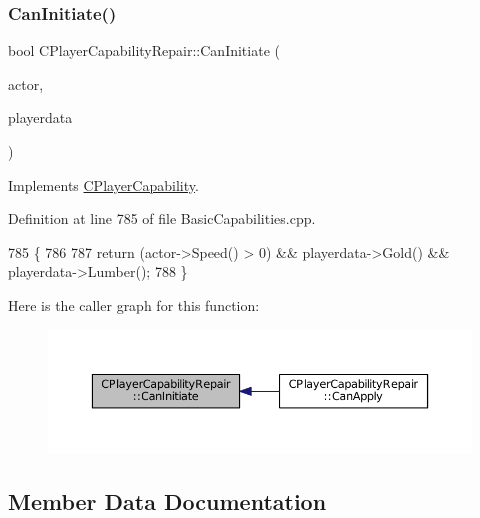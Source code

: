 \subsubsection{\texorpdfstring{Can\+Initiate()}{CanInitiate()}}
{\footnotesize\ttfamily bool C\+Player\+Capability\+Repair\+::\+Can\+Initiate (\begin{DoxyParamCaption}\item[{std\+::shared\+\_\+ptr$<$ \hyperlink{classCPlayerAsset}{C\+Player\+Asset} $>$}]{actor,  }\item[{std\+::shared\+\_\+ptr$<$ \hyperlink{classCPlayerData}{C\+Player\+Data} $>$}]{playerdata }\end{DoxyParamCaption})\hspace{0.3cm}{\ttfamily [virtual]}}



Implements \hyperlink{classCPlayerCapability_aa83b1e1fcaff2985c378132d679154ea}{C\+Player\+Capability}.



Definition at line 785 of file Basic\+Capabilities.\+cpp.


\begin{DoxyCode}
785                                                                                                            
                \{
786     
787     \textcolor{keywordflow}{return} (actor->Speed() > 0) && playerdata->Gold() && playerdata->Lumber();
788 \}
\end{DoxyCode}
Here is the caller graph for this function\+:\nopagebreak
\begin{figure}[H]
\begin{center}
\leavevmode
\includegraphics[width=350pt]{classCPlayerCapabilityRepair_a579761cab74d447b95856a24a7841b2e_icgraph}
\end{center}
\end{figure}


\subsection{Member Data Documentation}
\hypertarget{classCPlayerCapabilityRepair_ac0cc247c8d2ba96b6c6feabfcfb6ac19}{}\label{classCPlayerCapabilityRepair_ac0cc247c8d2ba96b6c6feabfcfb6ac19} 
